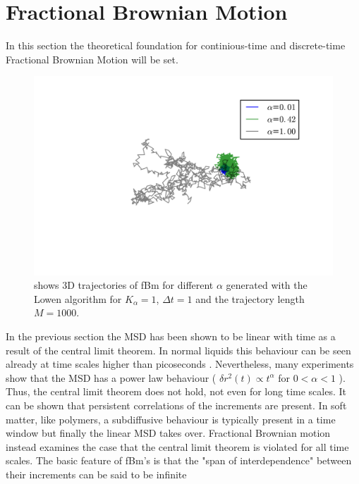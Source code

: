 \documentclass[
  a4paper,BCOR10mm,oneside,
  bibtotoc,idxtotoc,
  headsepline,footsepline,%
  fleqn,openbib
]{scrbook}
\begin{document}


\section{Fractional Brownian Motion}\label{sectionfrac}
In this section the theoretical foundation for continious-time and discrete-time Fractional Brownian Motion will be set.
\begin{figure}[h!]
\centering
\includegraphics[width=\textwidth]{./data/trajectories_differentalpha.png}
\caption{shows 3D trajectories of fBm for different $\alpha$ generated with the Lowen algorithm for $K_{\alpha}=1$, $\Delta t=1$ and the trajectory length $M=1000$.}
\label{alphachangetrajectory}
\end{figure}
In the previous section the MSD has been shown to be linear with time as a result of the central limit theorem. In normal liquids this behaviour can be seen already at time scales higher than picoseconds \cite{Hofling2013}. Nevertheless, many experiments show that the MSD has a power law behaviour ( $\delta r ^2 (t) \propto t^{\alpha}$ for  $0 < \alpha < 1$ ). Thus, the central limit theorem does not hold, not even for long time scales. It can be shown that persistent correlations of the increments are present. In soft matter, like polymers, a subdiffusive behaviour is typically present in a time window but finally the linear MSD takes over. Fractional Brownian motion instead examines the case that the central limit theorem is violated for all time scales. The basic feature of fBm's is that the "span of interdependence" between their increments can be said to be infinite \cite{Mandelbrot1968}\\
\end{document}
